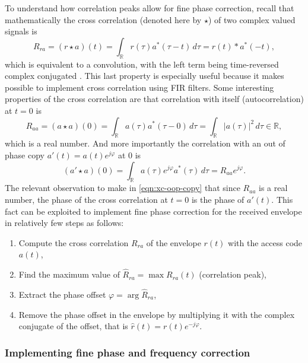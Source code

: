 To understand how correlation peaks allow for fine phase correction, recall that mathematically the cross correlation (denoted here by \(\star\)) of two complex valued signals is
\begin{equation}
	R_{ra}
	= (r \star a)(t)
	= \int_\mathbb{R} r(\tau) a^*(\tau - t) \,d\tau
	= r(t) * a^*(-t),
\end{equation}
which is equivalent to a convolution, with the left term being time-reversed complex conjugated \cite{Gallager}. This last property is especially useful because it makes possible to implement cross correlation using FIR filters. Some interesting properties of the cross correlation are that correlation with itself (autocorrelation) at \(t = 0\) is
\begin{equation}
	R_{aa} = (a \star a)(0)
	= \int_\mathbb{R} a(\tau) a^*(\tau - 0) \,d\tau
	= \int_\mathbb{R} |a(\tau)|^2 \,d\tau \in \mathbb{R},
\end{equation}
which is a real number. And more importantly the correlation with an out of phase copy \(a'(t) = a(t) e^{j\varphi}\) at 0 is
\begin{equation} \label{eqn:xc-oop-copy}
	(a' \star a)(0) 
	= \int_\mathbb{R} a(\tau)e^{j\varphi}  a^*(\tau) \,d\tau
	= R_{aa} e^{j\varphi}.
\end{equation}
The relevant observation to make in \eqref{eqn:xc-oop-copy} that since \(R_{aa}\) is a real number, the phase of the cross correlation at \(t = 0\) is the phase of \(a'(t)\). This fact can be exploited to implement fine phase correction for the received envelope in relatively few steps as follows:
\begin{enumerate}
	\item Compute the cross correlation \(R_{ra}\) of the envelope \(r(t)\) with the access code \(a(t)\),
	\item Find the maximum value of \(\hat{R}_{ra} = \max R_{ra}(t)\) (correlation peak),
	\item Extract the phase offset \(\varphi = \arg \hat{R}_{ra}\),
	\item Remove the phase offset in the envelope by multiplying it with the complex conjugate of the offset, that is \(\hat{r}(t) = r(t) e^{-j\varphi}\).
\end{enumerate}

\subsubsection{Implementing fine phase and frequency correction}


